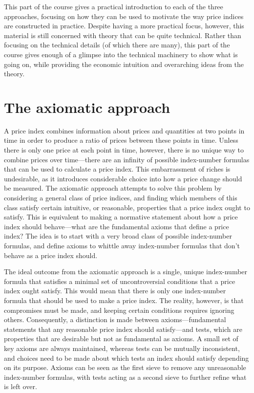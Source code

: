 \documentclass[]{article}
\begin{document}
This part of the course gives a practical introduction to each of the three approaches, focusing on how they can be used to motivate the way price indices are constructed in practice. Despite having a more practical focus, however, this material is still concerned with theory that can be quite technical. Rather than focusing on the technical details (of which there are many), this part of the course gives enough of a glimpse into the technical machinery to show what is going on, while providing the economic intuition and overarching ideas from the theory.

\hypertarget{the-axiomatic-approach}{%
\section{The axiomatic approach}\label{the-axiomatic-approach}}

A price index combines information about prices and quantities at two points in time in order to produce a ratio of prices between these points in time. Unless there is only one price at each point in time, however, there is no unique way to combine prices over time---there are an infinity of possible index-number formulas that can be used to calculate a price index. This embarrassment of riches is undesirable, as it introduces considerable choice into how a price change should be measured. The axiomatic approach attempts to solve this problem by considering a general class of price indices, and finding which members of this class satisfy certain intuitive, or reasonable, properties that a price index ought to satisfy. This is equivalent to making a normative statement about how a price index should behave---what are the fundamental axioms that define a price index? The idea is to start with a very broad class of possible index-number formulas, and define axioms to whittle away index-number formulas that don't behave as a price index should.

The ideal outcome from the axiomatic approach is a single, unique index-number formula that satisfies a minimal set of uncontroversial conditions that a price index ought satisfy. This would mean that there is only one index-number formula that should be used to make a price index. The reality, however, is that compromises must be made, and keeping certain conditions requires ignoring others. Consequently, a distinction is made between axioms---fundamental statements that any reasonable price index should satisfy---and tests, which are properties that are desirable but not as fundamental as axioms. A small set of key axioms are always maintained, whereas tests can be mutually inconsistent, and choices need to be made about which tests an index should satisfy depending on its purpose. Axioms can be seen as the first sieve to remove any unreasonable index-number formulas, with tests acting as a second sieve to further refine what is left over.
\end{document}
